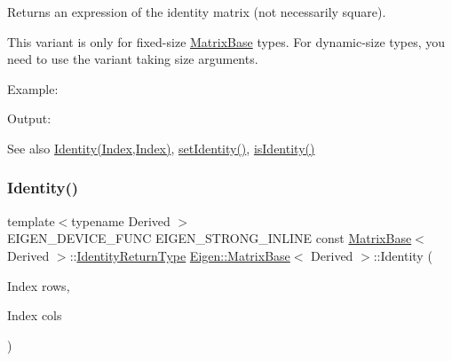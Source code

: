 \begin{DoxyReturn}{Returns}
an expression of the identity matrix (not necessarily square).
\end{DoxyReturn}
This variant is only for fixed-\/size \mbox{\hyperlink{class_eigen_1_1_matrix_base}{Matrix\+Base}} types. For dynamic-\/size types, you need to use the variant taking size arguments.

Example\+: 
\begin{DoxyCodeInclude}{0}
\end{DoxyCodeInclude}
 Output\+: 
\begin{DoxyVerbInclude}
\end{DoxyVerbInclude}


\begin{DoxySeeAlso}{See also}
\mbox{\hyperlink{class_eigen_1_1_matrix_base_ae717f291d83ab229ae64a4903d9f987d}{Identity(\+Index,\+Index)}}, \mbox{\hyperlink{class_eigen_1_1_matrix_base_ae05be7fcc1ade707f0b73eb5f9d8cf33}{set\+Identity()}}, \mbox{\hyperlink{class_eigen_1_1_matrix_base_a4ccbd8dfa06e9d47b9bf84711f8b9d40}{is\+Identity()}} 
\end{DoxySeeAlso}
\mbox{\label{class_eigen_1_1_matrix_base_ae717f291d83ab229ae64a4903d9f987d}} 
\subsubsection{\texorpdfstring{Identity()}{Identity()}\hspace{0.1cm}{\footnotesize\ttfamily [2/2]}}
{\footnotesize\ttfamily template$<$typename Derived $>$ \\
E\+I\+G\+E\+N\+\_\+\+D\+E\+V\+I\+C\+E\+\_\+\+F\+U\+NC E\+I\+G\+E\+N\+\_\+\+S\+T\+R\+O\+N\+G\+\_\+\+I\+N\+L\+I\+NE const \mbox{\hyperlink{class_eigen_1_1_matrix_base}{Matrix\+Base}}$<$ Derived $>$\+::\mbox{\hyperlink{class_eigen_1_1_cwise_nullary_op}{Identity\+Return\+Type}} \mbox{\hyperlink{class_eigen_1_1_matrix_base}{Eigen\+::\+Matrix\+Base}}$<$ Derived $>$\+::Identity (\begin{DoxyParamCaption}\item[{Index}]{rows,  }\item[{Index}]{cols }\end{DoxyParamCaption})\hspace{0.3cm}{\ttfamily [static]}}

